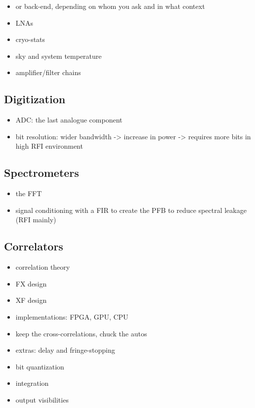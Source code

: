 \documentclass[usenatbib,usegraphicx]{article}
\begin{document}
\begin{itemize}
\item or back-end, depending on whom you ask and in what context
\item LNAs
\item cryo-stats
\item sky and system temperature
\item amplifier/filter chains
\end{itemize}

\subsection{Digitization}

\begin{itemize}
\item ADC: the last analogue component
\item bit resolution: wider bandwidth -> increase in power -> requires more bits in high RFI environment
\end{itemize}

\subsection{Spectrometers}

\begin{itemize}
\item the FFT
\item signal conditioning with a FIR to create the PFB to reduce spectral leakage (RFI mainly)
\end{itemize}

\subsection{Correlators}

\begin{itemize}
\item correlation theory
\item FX design
\item XF design
\item implementations: FPGA, GPU, CPU
\item keep the cross-correlations, chuck the autos
\item extras: delay and fringe-stopping
\item bit quantization
\item integration
\item output visibilities
\end{itemize}
\end{document}

